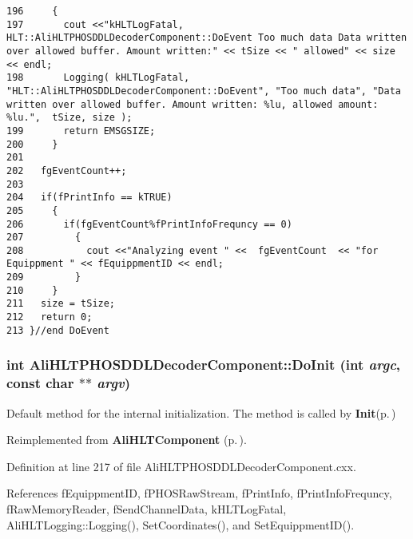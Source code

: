 \begin{verbatim}
196     {
197       cout <<"kHLTLogFatal, HLT::AliHLTPHOSDDLDecoderComponent::DoEvent Too much data Data written over allowed buffer. Amount written:" << tSize << " allowed" << size << endl;
198       Logging( kHLTLogFatal, "HLT::AliHLTPHOSDDLDecoderComponent::DoEvent", "Too much data", "Data written over allowed buffer. Amount written: %lu, allowed amount: %lu.",  tSize, size );
199       return EMSGSIZE;
200     }
201 
202   fgEventCount++; 
203   
204   if(fPrintInfo == kTRUE)
205     {
206       if(fgEventCount%fPrintInfoFrequncy == 0)
207         {
208           cout <<"Analyzing event " <<  fgEventCount  << "for Equippment " << fEquippmentID << endl; 
209         }  
210     }
211   size = tSize;
212   return 0;
213 }//end DoEvent
\end{verbatim}\normalsize 


\subsubsection{\setlength{\rightskip}{0pt plus 5cm}int Ali\-HLTPHOSDDLDecoder\-Component::Do\-Init (int {\em argc}, const char $\ast$$\ast$ {\em argv})\hspace{0.3cm}{\tt  [virtual]}}\label{classAliHLTPHOSDDLDecoderComponent_a4}


Default method for the internal initialization. The method is called by {\bf Init}{\rm (p.\,\pageref{classAliHLTProcessor_a2})} 

Reimplemented from {\bf Ali\-HLTComponent} {\rm (p.\,\pageref{classAliHLTComponent_b5})}.

Definition at line 217 of file Ali\-HLTPHOSDDLDecoder\-Component.cxx.

References f\-Equippment\-ID, f\-PHOSRaw\-Stream, f\-Print\-Info, f\-Print\-Info\-Frequncy, f\-Raw\-Memory\-Reader, f\-Send\-Channel\-Data, k\-HLTLog\-Fatal, Ali\-HLTLogging::Logging(), Set\-Coordinates(), and Set\-Equippment\-ID().

